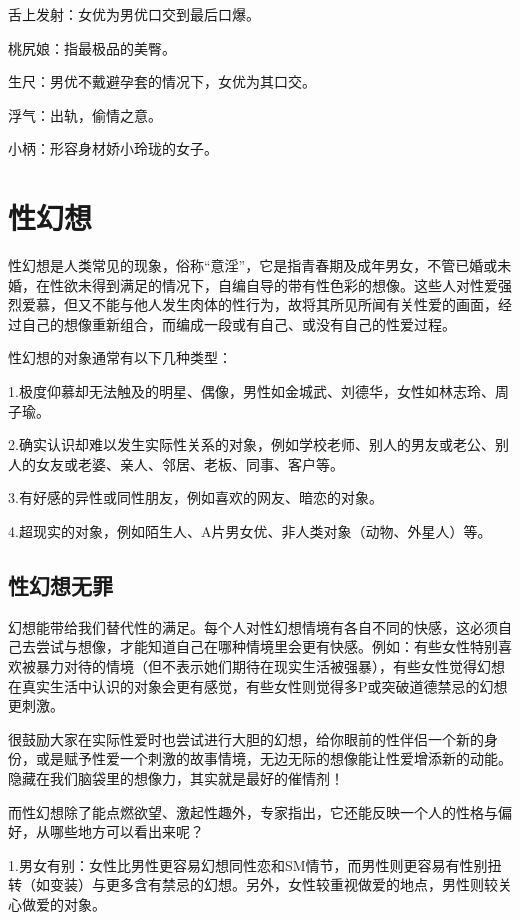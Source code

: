 \documentclass[12pt,UTF8]{ctexbook}
\begin{document}
舌上发射：女优为男优口交到最后口爆。

桃尻娘：指最极品的美臀。

生尺：男优不戴避孕套的情况下，女优为其口交。

浮气：出轨，偷情之意。

小柄：形容身材娇小玲珑的女子。

\chapter{性幻想}

性幻想是人类常见的现象，俗称“意淫”，它是指青春期及成年男女，不管已婚或未婚，在性欲未得到满足的情况下，自编自导的带有性色彩的想像。这些人对性爱强烈爱慕，但又不能与他人发生肉体的性行为，故将其所见所闻有关性爱的画面，经过自己的想像重新组合，而编成一段或有自己、或没有自己的性爱过程。

性幻想的对象通常有以下几种类型：

1.极度仰慕却无法触及的明星、偶像，男性如金城武、刘德华，女性如林志玲、周子瑜。

2.确实认识却难以发生实际性关系的对象，例如学校老师、别人的男友或老公、别人的女友或老婆、亲人、邻居、老板、同事、客户等。

3.有好感的异性或同性朋友，例如喜欢的网友、暗恋的对象。

4.超现实的对象，例如陌生人、A片男女优、非人类对象（动物、外星人）等。

\section{性幻想无罪}

幻想能带给我们替代性的满足。每个人对性幻想情境有各自不同的快感，这必须自己去尝试与想像，才能知道自己在哪种情境里会更有快感。例如：有些女性特别喜欢被暴力对待的情境（但不表示她们期待在现实生活被强暴），有些女性觉得幻想在真实生活中认识的对象会更有感觉，有些女性则觉得多P或突破道德禁忌的幻想更刺激。

很鼓励大家在实际性爱时也尝试进行大胆的幻想，给你眼前的性伴侣一个新的身份，或是赋予性爱一个刺激的故事情境，无边无际的想像能让性爱增添新的动能。隐藏在我们脑袋里的想像力，其实就是最好的催情剂！

而性幻想除了能点燃欲望、激起性趣外，专家指出，它还能反映一个人的性格与偏好，从哪些地方可以看出来呢？

1.男女有别：女性比男性更容易幻想同性恋和SM情节，而男性则更容易有性别扭转（如变装）与更多含有禁忌的幻想。另外，女性较重视做爱的地点，男性则较关心做爱的对象。
\end{document}

